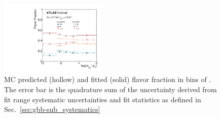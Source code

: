\begin{figure}[htbp]
  \centering
  \includegraphics[width=0.45\textwidth]{figures/gbb/paperplots/Canv_fracmasspt_FracDataMC}      
\caption{MC predicted (hollow) and fitted (solid) flavor fraction in bins of \mpt. The error bar is the quadrature sum of the uncertainty derived from fit range systematic uncertainties and fit statistics as defined in Sec.~\ref{sec:gbb-sub_systematics}}
  \label{fig:fracmasspt-fitfrac}
\end{figure}



